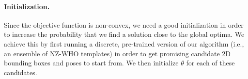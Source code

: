 \paragraph{Initialization.}
Since the objective function is non-convex, we need a good initialization in order to
increase the probability that we find a solution close to the
global optima. We achieve this by first running a discrete,
pre-trained version of our algorithm (i.e., an ensemble of NZ-WHO
templates) in order to get promising candidate 2D bounding boxes and
poses to start from. We then initialize $\theta$ for each of these candidates.
